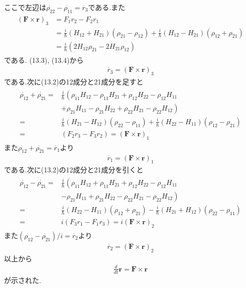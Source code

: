 \documentclass[uplatex,a4j,11pt,dvipdfmx]{jsarticle}
\begin{document}
ここで左辺は$\dot{\rho_{22}}-\dot{\rho_{11}}=\dot{r_3}$である.また
\begin{align}
  \begin{split}
    ({\bm F}\times {\bm r})_3&=F_1r_2-F_2r_1\\
    &=\frac{i}{\hbar}(H_{12}+H_{21})(\rho_{21}-\rho_{12})+\frac{i}{\hbar}(H_{12}-H_{21})(\rho_{12}+\rho_{21})\\
    &=\frac{i}{\hbar}(2H_{12}\rho_{21}-2H_{21}\rho_{12})
  \end{split}
\end{align}
である. (13.3), (13.4)から
\begin{align}
  \dot{r_3}=({\bm F}\times {\bm r})_3
\end{align}
である.次に(13.2)の12成分と21成分を足すと
\begin{align}
  \begin{split}
    \dot{\rho_{12}}+\dot{\rho_{21}}=&\frac{i}{\hbar}\left(\rho_{11}H_{12}-\rho_{11}H_{21}+\rho_{12}H_{22}-\rho_{12}H_{11}\right.\\
    &+\left.\rho_{21}H_{11}-\rho_{21}H_{22}+\rho_{22}H_{21}-\rho_{22}H_{12}\right)\\
    =&\frac{i}{\hbar}(H_{21}-H_{12})(\rho_{22}-\rho_{11})+\frac{i}{\hbar}(H_{22}-H_{11})(\rho_{12}-\rho_{21})\\
    =&(F_2r_3-F_3r_2)=({\bm F}\times{\bm r})_1
  \end{split}
\end{align}
また$\dot{\rho_{12}}+\dot{\rho_{21}}=\dot{r_1}$より
\begin{align}
  \dot{r_1}=({\bm F}\times{\bm r})_1
\end{align}
である.次に(13.2)の12成分と21成分を引くと
\begin{align}
  \begin{split}
    \dot{\rho_{12}}-\dot{\rho_{21}}=&\frac{i}{\hbar}
    \left(\rho_{11}H_{12}+\rho_{11}H_{21}+\rho_{12}H_{22}-\rho_{12}H_{11}\right.\\
    &-\left.\rho_{21}H_{11}+\rho_{21}H_{22}-\rho_{22}H_{21}-\rho_{22}H_{12}\right)\\
    =&\frac{i}{\hbar}(H_{22}-H_{11})(\rho_{12}+\rho_{21})-\frac{i}{\hbar}(H_{21}+H_{12})(\rho_{22}-\rho_{11})\\
    =&i(F_3r_1-F_1r_3)=i({\bm F}\times{\bm r})_2
  \end{split}
\end{align}
また$(\dot{\rho_{12}}-\dot{\rho_{21}})/i=\dot{r_2}$より
\begin{align}
  \dot{r_2}=({\bm F}\times{\bm r})_2
\end{align}
以上から
\begin{align}
  \frac{d}{dt}{\bm r}={\bm F}\times{\bm r}
\end{align}
が示された.

\end{document}
